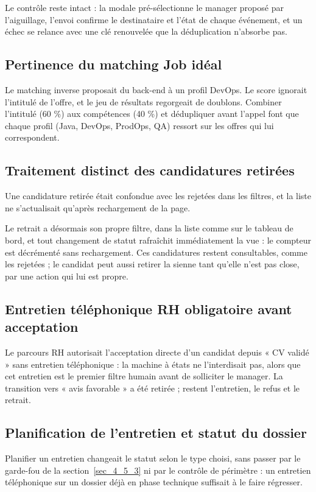 \documentclass[]{./tpl/isipfe}
\begin{document}
Le contrôle reste intact : la modale pré-sélectionne le manager proposé par l’aiguillage, l’envoi confirme le destinataire et l’état de chaque événement, et un échec se relance avec une clé renouvelée que la déduplication n’absorbe pas.

\subsection{Pertinence du matching Job idéal}
\label{sec_4_5_6}
Le matching inverse proposait du back-end à un profil DevOps. Le score ignorait l’intitulé de l’offre, et le jeu de résultats regorgeait de doublons. Combiner l’intitulé (60 \%) aux compétences (40 \%) et dédupliquer avant l’appel font que chaque profil (Java, DevOps, ProdOps, QA) ressort sur les offres qui lui correspondent.

\subsection{Traitement distinct des candidatures retirées}
\label{sec_4_5_7}
Une candidature retirée était confondue avec les rejetées dans les filtres, et la liste ne s’actualisait qu’après rechargement de la page.

Le retrait a désormais son propre filtre, dans la liste comme sur le tableau de bord, et tout changement de statut rafraîchit immédiatement la vue : le compteur est décrémenté sans rechargement. Ces candidatures restent consultables, comme les rejetées ; le candidat peut aussi retirer la sienne tant qu’elle n’est pas close, par une action qui lui est propre.

\subsection{Entretien téléphonique RH obligatoire avant acceptation}
\label{sec_4_5_8}
Le parcours RH autorisait l’acceptation directe d’un candidat depuis « CV validé » sans entretien téléphonique : la machine à états ne l’interdisait pas, alors que cet entretien est le premier filtre humain avant de solliciter le manager. La transition vers « avis favorable » a été retirée ; restent l’entretien, le refus et le retrait.

\subsection{Planification de l’entretien et statut du dossier}
\label{sec_4_5_9}
Planifier un entretien changeait le statut selon le type choisi, sans passer par le garde-fou de la section~\ref{sec_4_5_3} ni par le contrôle de périmètre : un entretien téléphonique sur un dossier déjà en phase technique suffisait à le faire régresser.
\end{document}
